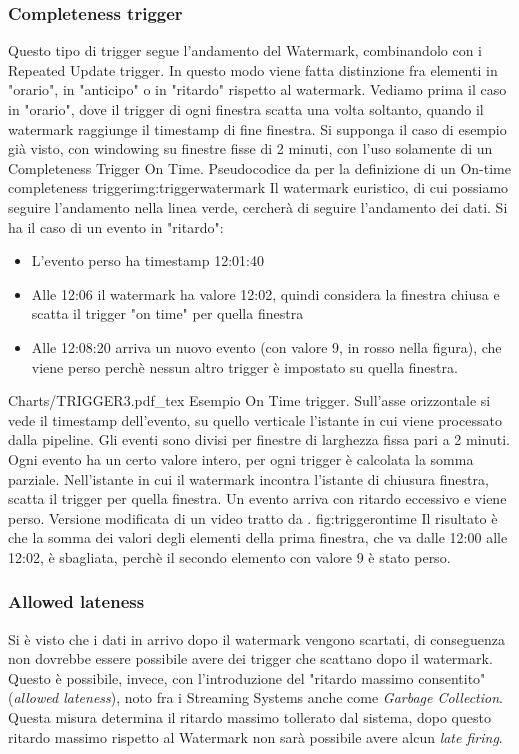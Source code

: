 \subsubsection{Completeness trigger}
Questo tipo di trigger segue l'andamento del Watermark, combinandolo con i Repeated Update trigger. In questo modo viene fatta distinzione fra elementi in "orario", in "anticipo" o in "ritardo" rispetto al watermark. Vediamo prima il caso in "orario", dove il trigger di ogni finestra scatta una volta soltanto, quando il watermark raggiunge il timestamp di fine finestra.
Si supponga il caso di esempio già visto, con windowing su finestre fisse di 2 minuti, con l'uso solamente di un Completeness Trigger On Time.
{{Pseudocodice da \cite{akidauchernyaklax} per la definizione di un On-time completeness trigger}}{img:triggerwatermark}
Il watermark euristico, di cui possiamo seguire l'andamento nella linea verde, cercherà di seguire l'andamento dei dati. Si ha il caso di un evento in "ritardo":
\begin{itemize}
\item L'evento perso ha timestamp 12:01:40
\item Alle 12:06 il watermark ha valore 12:02, quindi considera la finestra chiusa e scatta il trigger "on time" per quella finestra
\item Alle 12:08:20 arriva un nuovo evento (con valore 9, in rosso nella figura), che viene perso perchè nessun altro trigger è impostato su quella finestra.
\end{itemize}
\svg
{Charts/TRIGGER3.pdf_tex}
{Esempio On Time trigger. Sull'asse orizzontale si vede il timestamp dell'evento, su quello verticale l'istante in cui viene processato dalla pipeline. Gli eventi sono divisi per finestre di larghezza fissa pari a 2 minuti. Ogni evento ha un certo valore intero, per ogni trigger è calcolata la somma parziale. Nell'istante in cui il watermark incontra l'istante di chiusura finestra, scatta il trigger per quella finestra. Un evento arriva con ritardo eccessivo e viene perso. Versione modificata di un video tratto da  \cite{akidau_chernyak_lax_2018}. }
{fig:triggerontime}
Il risultato è che la somma dei valori degli elementi della prima finestra, che va dalle 12:00 alle 12:02, è sbagliata, perchè il secondo elemento con valore 9 è stato perso.

\subsubsection{Allowed lateness}
Si è visto che i dati in arrivo dopo il watermark vengono scartati, di conseguenza non dovrebbe essere possibile avere dei trigger che scattano dopo il watermark. Questo è possibile, invece, con l'introduzione del "ritardo massimo consentito" (\textit{allowed lateness}), noto fra i Streaming Systems anche come \textit{Garbage Collection}. Questa misura determina il ritardo massimo tollerato dal sistema, dopo questo ritardo massimo rispetto al Watermark non sarà possibile avere alcun \textit{late firing}.

